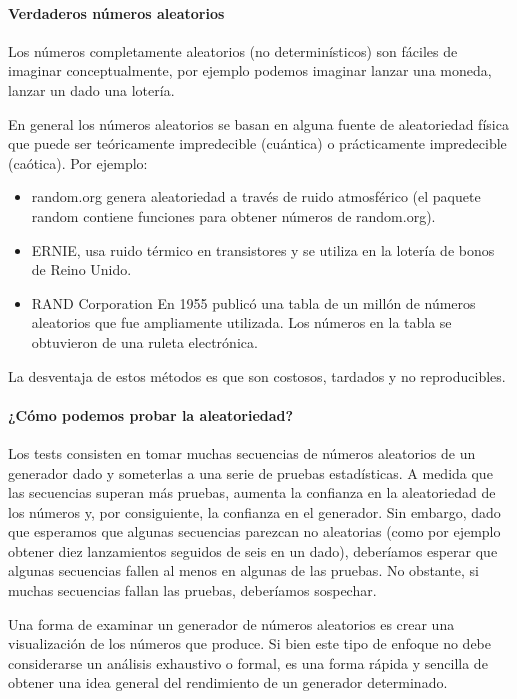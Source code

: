 \documentclass{article}
\begin{document}
\paragraph{Verdaderos números aleatorios} Los números completamente aleatorios (no determinísticos) son fáciles de imaginar conceptualmente, por ejemplo podemos imaginar lanzar una moneda, lanzar un dado una lotería.

En general los números aleatorios se basan en alguna fuente de aleatoriedad física que puede ser teóricamente impredecible (cuántica) o prácticamente impredecible (caótica). Por ejemplo:
\begin{itemize}
  \item random.org genera aleatoriedad a través de ruido atmosférico (el paquete random contiene funciones para obtener números de random.org).
  \item ERNIE, usa ruido térmico en transistores y se utiliza en la lotería de bonos de Reino Unido.
  \item RAND Corporation En 1955 publicó una tabla de un millón de números aleatorios que fue ampliamente utilizada. Los números en la tabla se obtuvieron de una ruleta electrónica.
\end{itemize}

La desventaja de estos métodos es que son costosos, tardados y no reproducibles.

\paragraph{¿Cómo podemos probar la aleatoriedad?} Los tests consisten en tomar muchas secuencias de números aleatorios de un generador dado y someterlas a una serie de pruebas estadísticas. A medida que las secuencias superan más pruebas, aumenta la confianza en la aleatoriedad de los números y, por consiguiente, la confianza en el generador. Sin embargo, dado que esperamos que algunas secuencias parezcan no aleatorias (como por ejemplo obtener diez lanzamientos seguidos de seis en un dado), deberíamos esperar que algunas secuencias fallen al menos en algunas de las pruebas. No obstante, si muchas secuencias fallan las pruebas, deberíamos sospechar.

Una forma de examinar un generador de números aleatorios es crear una visualización de los números que produce. Si bien este tipo de enfoque no debe considerarse un análisis exhaustivo o formal, es una forma rápida y sencilla de obtener una idea general del rendimiento de un generador determinado.
\end{document}
